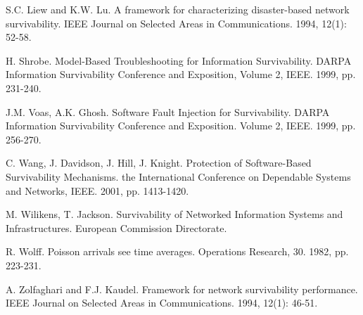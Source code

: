 \documentclass[onecolumn,conference]{IEEEtran}
\begin{document}
\begin{thebibliography}{00}
         S.C. Liew and K.W. Lu. A framework for characterizing disaster-based network survivability.  IEEE Journal on Selected Areas in Communications. 1994, 12(1): 52-58.

         H. Shrobe. Model-Based Troubleshooting for Information Survivability.  DARPA Information Survivability Conference and Exposition, Volume 2, IEEE. 1999, pp. 231-240.

         J.M. Voas, A.K. Ghosh. Software Fault Injection for Survivability. DARPA Information Survivability Conference and Exposition. Volume 2, IEEE. 1999, pp. 256-270.

         C. Wang, J. Davidson, J. Hill, J. Knight. Protection of Software-Based Survivability Mechanisms.  the International Conference on Dependable Systems and Networks, IEEE. 2001, pp. 1413-1420.

         M. Wilikens, T. Jackson. Survivability of Networked Information Systems and Infrastructures.  European Commission Directorate.

         R. Wolff. Poisson arrivals see time averages. Operations Research, 30. 1982, pp. 223-231.

         A. Zolfaghari and F.J. Kaudel. Framework for network survivability performance.  IEEE Journal on Selected Areas in Communications. 1994, 12(1): 46-51.

    \end{thebibliography}
\end{document}
